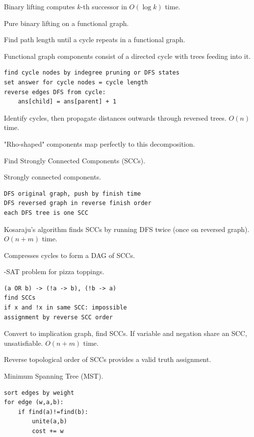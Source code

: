 \Solution Binary lifting computes $k$-th successor in $O(\log k)$ time.

\Analysis Pure binary lifting on a functional graph.


\Problem Find path length until a cycle repeats in a functional graph.

\State Functional graph components consist of a directed cycle with trees feeding into it.
\begin{lstlisting}
find cycle nodes by indegree pruning or DFS states
set answer for cycle nodes = cycle length
reverse edges DFS from cycle:
    ans[child] = ans[parent] + 1
\end{lstlisting}

\Solution Identify cycles, then propagate distances outwards through reversed trees. $O(n)$ time.

\Analysis "Rho-shaped" components map perfectly to this decomposition.


\Problem Find Strongly Connected Components (SCCs).

\State Strongly connected components.
\begin{lstlisting}
DFS original graph, push by finish time
DFS reversed graph in reverse finish order
each DFS tree is one SCC
\end{lstlisting}

\Solution Kosaraju's algorithm finds SCCs by running DFS twice (once on reversed graph). $O(n+m)$ time.

\Analysis Compresses cycles to form a DAG of SCCs.


-SAT problem for pizza toppings.

\begin{lstlisting}
(a OR b) -> (!a -> b), (!b -> a)
find SCCs
if x and !x in same SCC: impossible
assignment by reverse SCC order
\end{lstlisting}

\Solution Convert to implication graph, find SCCs. If variable and negation share an SCC, unsatisfiable. $O(n+m)$ time.

\Analysis Reverse topological order of SCCs provides a valid truth assignment.


\Problem Minimum Spanning Tree (MST).

\begin{lstlisting}
sort edges by weight
for edge (w,a,b):
    if find(a)!=find(b):
        unite(a,b)
        cost += w
\end{lstlisting}

